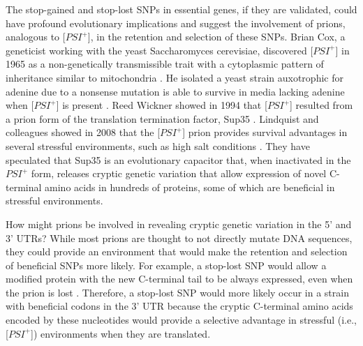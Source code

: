 The stop-gained and stop-lost SNPs in essential genes, if they are validated, could have profound evolutionary implications and suggest the involvement of prions, analogous to [$PSI^+$], in the retention and selection of these SNPs.  Brian Cox, a geneticist working with the yeast Saccharomyces cerevisiae, discovered [$PSI^+$] in 1965 as a non-genetically transmissible trait with a cytoplasmic pattern of inheritance similar to mitochondria \cite{cox1988psi}. He isolated a yeast strain auxotrophic for adenine due to a nonsense mutation is able to survive in media lacking adenine when [$PSI^+$] is present \cite{cox1988psi}. Reed Wickner showed in 1994 that [$PSI^+$] resulted from a prion form of the translation termination factor, Sup35 \cite{wickner1994ure3}. Lindquist and colleagues showed in 2008 that the [$PSI^+$] prion provides survival advantages in several stressful environments, such as high salt conditions \cite{tyedmers2008prion}. They have speculated that Sup35 is an evolutionary capacitor that, when inactivated in the $PSI^+$ form, releases cryptic genetic variation that allow expression of novel C-terminal amino acids in hundreds of proteins, some of which are beneficial in stressful environments. 

How might prions be involved in revealing cryptic genetic variation in the 5' and 3' UTRs? While most prions are thought to not directly mutate DNA sequences, they could provide an environment that would make the retention and selection of beneficial SNPs more likely. For example, a stop-lost SNP would allow a modified protein with the new C-terminal tail to be always expressed, even when the prion is lost \cite{tyedmers2008prion}. Therefore, a stop-lost SNP would more likely occur in a strain with beneficial codons in the 3' UTR because the cryptic C-terminal amino acids encoded by these nucleotides would provide a selective advantage in stressful (i.e., [$PSI^+$]) environments when they are translated.

